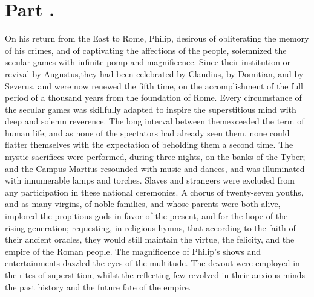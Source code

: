 \section{Part \thesection.}
\thispagestyle{simple}

On his return from the East to Rome, Philip, desirous of
obliterating the memory of his crimes, and of captivating the
affections of the people, solemnized the secular games with
infinite pomp and magnificence. Since their institution or
revival by Augustus,\footnotemark[56] they had been celebrated by Claudius, by
Domitian, and by Severus, and were now renewed the fifth time, on
the accomplishment of the full period of a thousand years from
the foundation of Rome. Every circumstance of the secular games
was skillfully adapted to inspire the superstitious mind with
deep and solemn reverence. The long interval between them\footnotemark[57]
exceeded the term of human life; and as none of the spectators
had already seen them, none could flatter themselves with the
expectation of beholding them a second time. The mystic
sacrifices were performed, during three nights, on the banks of
the Tyber; and the Campus Martius resounded with music and
dances, and was illuminated with innumerable lamps and torches.
Slaves and strangers were excluded from any participation in
these national ceremonies. A chorus of twenty-seven youths, and
as many virgins, of noble families, and whose parents were both
alive, implored the propitious gods in favor of the present, and
for the hope of the rising generation; requesting, in religious
hymns, that according to the faith of their ancient oracles, they
would still maintain the virtue, the felicity, and the empire of
the Roman people. The magnificence of Philip’s shows and
entertainments dazzled the eyes of the multitude. The devout were
employed in the rites of superstition, whilst the reflecting few
revolved in their anxious minds the past history and the future
fate of the empire.\footnotemark[58]



